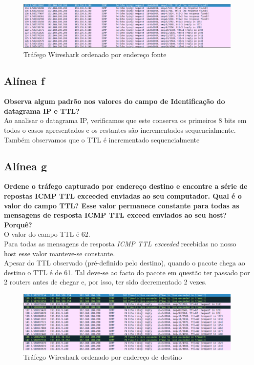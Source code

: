 \documentclass[a4paper]{report}
\begin{document}
\begin{figure}[H]
    \centering 
    \includegraphics[width=\textwidth]{images/wiresharkSourceEx2.png}
    \caption{Tráfego Wireshark ordenado por endereço fonte}
    \label{fig:wiresharkSourceEx2}
\end{figure}
\subsection{Alínea f}
\textbf{Observa algum padrão nos valores do campo de Identificação do datagrama
IP e TTL?}\\
Ao analisar o datagrama IP, verificamos que este conserva os primeiros 8 bits em
todos o casos apresentados e os restantes são incrementados sequencialmente.\\
Também observamos que o TTL é incrementado sequencialmente

\subsection{Alínea g}
\textbf{Ordene o tráfego capturado por endereço destino e encontre a série de
repostas ICMP TTL exceeded enviadas ao seu computador. Qual é o valor do campo
TTL? Esse valor permanece constante para todas as mensagens de resposta ICMP TTL
exceed enviados ao seu host? Porquê?}\\
O valor do campo TTL é 62.\\
Para todas as mensagens de resposta \textit{ICMP TTL exceeded} recebidas no
nosso host esse valor manteve-se constante.\\
Apesar do TTL observado (pré-definido pelo destino), quando o pacote chega ao
destino o TTL é de 61. Tal deve-se ao facto do pacote em questão ter passado por
2 routers antes de chegar e, por isso, ter sido decrementado 2 vezes.

\begin{figure}[H]
    \centering 
    \includegraphics[width=\textwidth]{images/wiresharkDestinyEx2.png}
    \caption{Tráfego Wireshark ordenado por endereço de destino}
    \label{fig:wiresharkDestinyEx2}
\end{figure}
\end{document}
